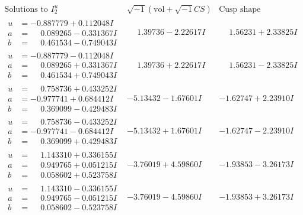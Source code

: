 \documentclass[1p]{elsarticle_modified}
\theoremstyle{definition}
\newcommand{\I}{\sqrt{-1}}
\begin{document}
$$\begin{array}{c|c|c}  
\text{Solutions to }I^u_{2}& \I (\text{vol} + \sqrt{-1}CS) & \text{Cusp shape}\\
 \hline 
\begin{aligned}
u &= -0.887779 + 0.112048 I \\
a &= \phantom{-}0.089265 - 0.331367 I \\
b &= \phantom{-}0.461534 - 0.749043 I\end{aligned}
 & \phantom{-}1.39736 - 2.22617 I & \phantom{-}1.56231 + 2.33825 I \\ \hline\begin{aligned}
u &= -0.887779 - 0.112048 I \\
a &= \phantom{-}0.089265 + 0.331367 I \\
b &= \phantom{-}0.461534 + 0.749043 I\end{aligned}
 & \phantom{-}1.39736 + 2.22617 I & \phantom{-}1.56231 - 2.33825 I \\ \hline\begin{aligned}
u &= \phantom{-}0.758736 + 0.433252 I \\
a &= -0.977741 + 0.684412 I \\
b &= \phantom{-}0.369099 - 0.429483 I\end{aligned}
 & -5.13432 - 1.67601 I & -1.62747 + 2.23910 I \\ \hline\begin{aligned}
u &= \phantom{-}0.758736 - 0.433252 I \\
a &= -0.977741 - 0.684412 I \\
b &= \phantom{-}0.369099 + 0.429483 I\end{aligned}
 & -5.13432 + 1.67601 I & -1.62747 - 2.23910 I \\ \hline\begin{aligned}
u &= \phantom{-}1.143310 + 0.336155 I \\
a &= \phantom{-}0.949765 + 0.051215 I \\
b &= \phantom{-}0.058602 + 0.523758 I\end{aligned}
 & -3.76019 + 4.59860 I & -1.93853 - 3.26173 I \\ \hline\begin{aligned}
u &= \phantom{-}1.143310 - 0.336155 I \\
a &= \phantom{-}0.949765 - 0.051215 I \\
b &= \phantom{-}0.058602 - 0.523758 I\end{aligned}
 & -3.76019 - 4.59860 I & -1.93853 + 3.26173 I \\ \hline\begin{aligned}

\end{aligned}
\end{array}$$
\end{document}
